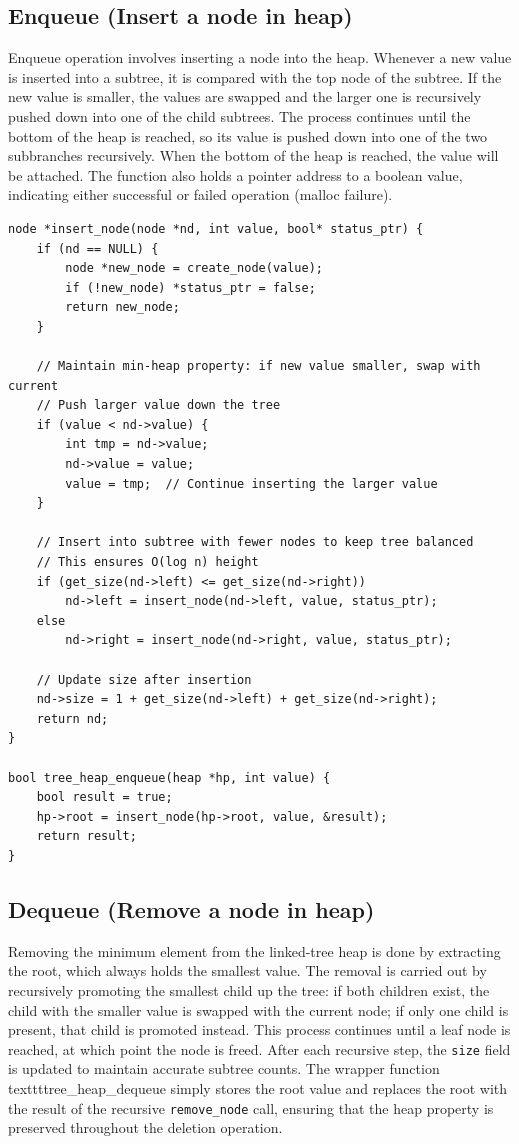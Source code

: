 \documentclass[a4paper,11pt]{article}
\begin{document}
\subsection*{Enqueue (Insert a node in heap)}

Enqueue operation involves inserting a node into the heap. Whenever a new value is inserted into a subtree, it is compared with the top node of the subtree. If the new value is smaller, the values are swapped and the larger one is recursively pushed down into one of the child subtrees. The process continues until the bottom of the heap is reached, so its value is pushed down into one of the two subbranches recursively. When the bottom of the heap is reached, the value will be attached. The function also holds a pointer address to a boolean value, indicating either successful or failed operation (malloc failure).

\begin{verbatim}
node *insert_node(node *nd, int value, bool* status_ptr) {
    if (nd == NULL) {
        node *new_node = create_node(value);
        if (!new_node) *status_ptr = false;
        return new_node;
    }

    // Maintain min-heap property: if new value smaller, swap with current
    // Push larger value down the tree
    if (value < nd->value) {
        int tmp = nd->value;
        nd->value = value;
        value = tmp;  // Continue inserting the larger value
    }

    // Insert into subtree with fewer nodes to keep tree balanced
    // This ensures O(log n) height
    if (get_size(nd->left) <= get_size(nd->right))
        nd->left = insert_node(nd->left, value, status_ptr);
    else
        nd->right = insert_node(nd->right, value, status_ptr);

    // Update size after insertion
    nd->size = 1 + get_size(nd->left) + get_size(nd->right);
    return nd;
}

bool tree_heap_enqueue(heap *hp, int value) {
    bool result = true;
    hp->root = insert_node(hp->root, value, &result);
    return result;
}
\end{verbatim}

\subsection*{Dequeue (Remove a node in heap)}

Removing the minimum element from the linked-tree heap is done by extracting the root, which always holds the smallest value. The removal is carried out by recursively promoting the smallest child up the tree: if both children exist, the child with the smaller value is swapped with the current node; if only one child is present, that child is promoted instead. This process continues until a leaf node is reached, at which point the node is freed. After each recursive step, the \texttt{size} field is updated to maintain accurate subtree counts. The wrapper function texttt{tree\_heap\_dequeue} simply stores the root value and replaces the root with the result of the recursive \texttt{remove\_node} call, ensuring that the heap property is preserved throughout the deletion operation.
\end{document}
